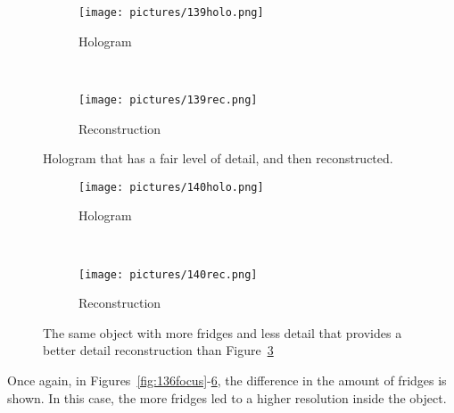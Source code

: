 \begin{figure}[ht!]
    \begin{center}

        \begin{subfigure}[t]{0.4\textwidth}
            \label{fig:139holo}
            \texttt{[image: pictures/139holo.png]}
            \caption{Hologram}
        \end{subfigure}
        \\
        \begin{subfigure}[t]{\textwidth}
            \label{fig:139rec}
            \texttt{[image: pictures/139rec.png]}
            \caption{Reconstruction}
        \end{subfigure}


    \end{center}
    \caption{%
        Hologram that has a fair level of detail, and then reconstructed.
    }%
    \label{fig:139}
\end{figure}


\begin{figure}[ht!]
    \begin{center}

        \begin{subfigure}[t]{0.4\textwidth}
            \label{fig:140holo}
            \texttt{[image: pictures/140holo.png]}
            \caption{Hologram}
        \end{subfigure}
        \\
        \begin{subfigure}[t]{\textwidth}
            \label{fig:140rec}
            \texttt{[image: pictures/140rec.png]}
            \caption{Reconstruction}
        \end{subfigure}


    \end{center}
    \caption{%
        The same object with more fridges and less detail that provides a
        better detail reconstruction than Figure~\ref{fig:139}
    }%
    \label{fig:140}
\end{figure}

Once again, in Figures~\ref{fig:136focus}-\ref{fig:140}, the difference in the
amount of fridges is shown. In this case, the more fridges led to a higher
resolution inside the object.


